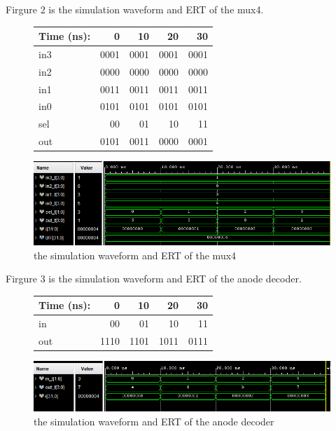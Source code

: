 \documentclass[11pt]{article}
\begin{document}
    Firgure 2 is the simulation waveform and ERT of the mux4.
    \begin{figure}[ht]\centering
        \begin{tabular}{l|rrrr}
            Time (ns): & 0 & 10 & 20 & 30 \\
            \midrule
            in3 & 0001 & 0001 & 0001 & 0001 \\
            in2 & 0000 & 0000 & 0000 & 0000 \\
            in1 & 0011 & 0011 & 0011 & 0011 \\
            in0 & 0101 & 0101 & 0101 & 0101 \\
            sel & 00 & 01 & 10 & 11 \\
            \midrule
            out & 0101 & 0011 & 0000 & 0001 \\
            \bottomrule
        \end{tabular}\medskip

        \includegraphics[width=1\textwidth]{mux4_simulation}
        \caption{the simulation waveform and ERT of the mux4}
        \label{fig:mux4_simulation}
    \end{figure}


    Firgure 3 is the simulation waveform and ERT of the anode decoder.
    \begin{figure}[ht]\centering
        \begin{tabular}{l|rrrr}
            Time (ns): & 0 & 10 & 20 & 30 \\
            \midrule
            in & 00 & 01 & 10 & 11 \\
            \midrule
            out & 1110 & 1101 & 1011 & 0111 \\
            \bottomrule
        \end{tabular}\medskip

        \includegraphics[width=1\textwidth]{anode_decoder_simulation}
        \caption{the simulation waveform and ERT of the anode decoder}
        \label{fig:anode_decoder_simulation}
    \end{figure}
\end{document}
